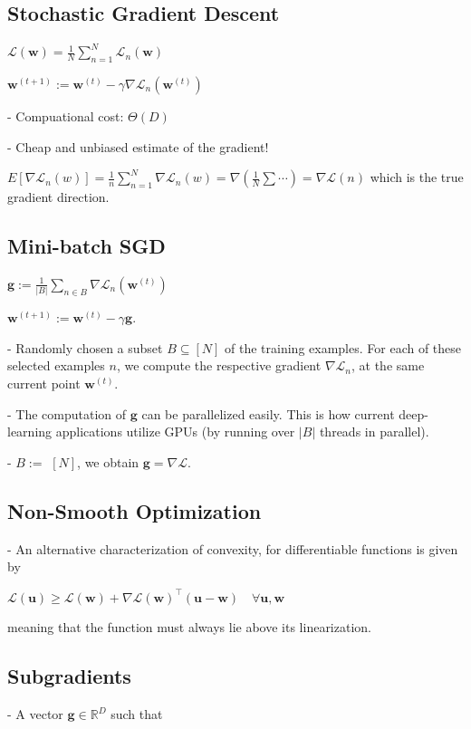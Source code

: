 \subsection*{Stochastic Gradient Descent}

$
\mathcal{L}(\mathbf{w})=\frac{1}{N} \sum_{n=1}^{N} \mathcal{L}_{n}(\mathbf{w})
$

$
\mathbf{w}^{(t+1)}:=\mathbf{w}^{(t)}-\gamma \nabla \mathcal{L}_{n}\left(\mathbf{w}^{(t)}\right)
$

- Compuational cost: $\Theta(D)$

- Cheap and unbiased estimate of the gradient!

$E[\nabla \mathcal{L}_n(w)]=\frac1n\sum_{n=1}^N\nabla \mathcal{L}_n(w)=\nabla\left(\frac1N\sum\cdots\right)=\nabla \mathcal{L}(n)$
which is the true gradient direction. 

\subsection*{Mini-batch SGD}

$
\mathbf{g}:=\frac{1}{|B|} \sum_{n \in B} \nabla \mathcal{L}_{n}\left(\mathbf{w}^{(t)}\right)
$

$
\mathbf{w}^{(t+1)}:=\mathbf{w}^{(t)}-\gamma \mathbf{g} .
$

- Randomly chosen a subset $B \subseteq[N]$ of the training examples. For each of these selected examples $n$, we compute the respective gradient $\nabla \mathcal{L}_{n}$, at the same current point $\mathbf{w}^{(t)}$.

- The computation of $\mathbf{g}$ can be parallelized easily. This is how current deep-learning applications utilize GPUs (by running over $|B|$ threads in parallel).

- $B:=$ $[N]$, we obtain $\mathbf{g}=\nabla \mathcal{L}$.

\subsection*{Non-Smooth Optimization}
- An alternative characterization of convexity, for differentiable functions is given by

$\mathcal{L}(\mathbf{u}) \geq \mathcal{L}(\mathbf{w})+\nabla \mathcal{L}(\mathbf{w})^{\top}(\mathbf{u}-\mathbf{w}) \quad \forall \mathbf{u}, \mathbf{w}$

meaning that the function must always lie above its linearization.

\subsection*{Subgradients}
- A vector $\mathbf{g} \in \mathbb{R}^{D}$ such that

